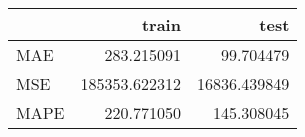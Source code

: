 \begin{tabular}{lrr}
\toprule
{} &          train &          test \\
\midrule
MAE  &     283.215091 &     99.704479 \\
MSE  &  185353.622312 &  16836.439849 \\
MAPE &     220.771050 &    145.308045 \\
\bottomrule
\end{tabular}
